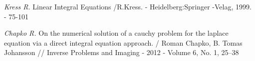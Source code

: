 \documentclass[a4 paper,12pt,ukrainian]{report}
\begin{document}
\renewcommand{\bibname}{Список літератури}
\begin{thebibliography}{99}

\emph{Kress R.} Linear Integral Equations /R.Kress. - Heidelberg:Springer -Velag, 1999. - 75-101

\emph{Chapko R.} On the numerical solution of a cauchy problem for the laplace equation via a direct integral equation approach. / Roman Chapko, B. Tomas Johansson // Inverse Problems and Imaging - 2012 - Volume 6, No. 1, 25–38


\end{thebibliography}
\end{document}
